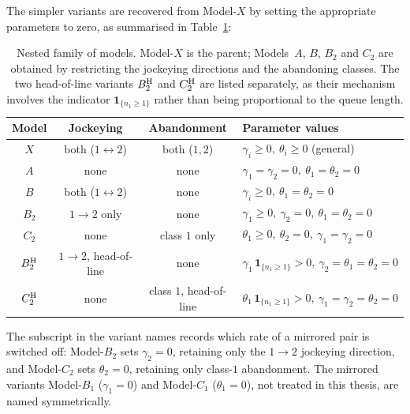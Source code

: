 The simpler variants are recovered from Model-$X$ by setting the appropriate parameters to zero, as summarised in Table~\ref{tab:model_family}:
\begin{table}[H]
    \centering
    \begin{tabular}{cccl}
        \hline
        Model & Jockeying & Abandonment & Parameter values \\
        \hline
        $X$  & both ($1\!\leftrightarrow\!2$) & both ($1,2$)       & $\gamma_i \geq 0,\ \theta_i \geq 0$ \quad (general) \\
        $A$  & none                            & none               & $\gamma_1=\gamma_2=0,\ \theta_1=\theta_2=0$ \\
        $B$  & both ($1\!\leftrightarrow\!2$) & none               & $\gamma_i \geq 0,\ \theta_1=\theta_2=0$ \\
        $B_2$ & $1\!\to\!2$ only                & none               & $\gamma_1 \geq 0,\ \gamma_2=0,\ \theta_1=\theta_2=0$ \\
        $C_2$ & none                            & class $1$ only     & $\theta_1 \geq 0,\ \theta_2=0,\ \gamma_1=\gamma_2=0$ \\
        \hline
        $B_2^{\mathrm{H}}$ & $1\!\to\!2$, head-of-line       & none                    & $\gamma_1\,\mathbf{1}_{\{n_1\ge1\}}>0,\ \gamma_2=\theta_1=\theta_2=0$ \\
        $C_2^{\mathrm{H}}$ & none                            & class $1$, head-of-line & $\theta_1\,\mathbf{1}_{\{n_1\ge1\}}>0,\ \gamma_1=\gamma_2=\theta_2=0$ \\
        \hline
    \end{tabular}
    \caption{Nested family of models. Model-$X$ is the parent; Models~$A$, $B$, $B_2$ and $C_2$
    are obtained by restricting the jockeying directions and the abandoning classes. The two
    head-of-line variants $B_2^{\mathrm{H}}$ and $C_2^{\mathrm{H}}$ are listed separately, as their mechanism involves the indicator $\mathbf{1}_{\{n_1\ge1\}}$ rather than being proportional to the queue length.}
    \label{tab:model_family}
    \par\smallskip
\end{table}

The subscript in the variant names records which rate of a mirrored pair is switched off: Model-$B_2$ sets $\gamma_2=0$, retaining only the $1\to2$ jockeying direction, and Model-$C_2$ sets $\theta_2=0$, retaining only class-$1$ abandonment. The mirrored variants Model-$B_1$ ($\gamma_1=0$) and Model-$C_1$ ($\theta_1=0$), not treated in this thesis, are named symmetrically.

